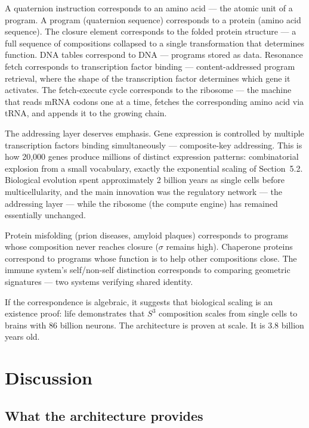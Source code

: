 \documentclass[12pt,a4paper]{article}
\begin{document}
A quaternion instruction corresponds to an amino acid --- the atomic unit of a program. A program (quaternion sequence) corresponds to a protein (amino acid sequence). The closure element corresponds to the folded protein structure --- a full sequence of compositions collapsed to a single transformation that determines function. DNA tables correspond to DNA --- programs stored as data. Resonance fetch corresponds to transcription factor binding --- content-addressed program retrieval, where the shape of the transcription factor determines which gene it activates. The fetch-execute cycle corresponds to the ribosome --- the machine that reads mRNA codons one at a time, fetches the corresponding amino acid via tRNA, and appends it to the growing chain.

The addressing layer deserves emphasis. Gene expression is controlled by multiple transcription factors binding simultaneously --- composite-key addressing. This is how 20,000 genes produce millions of distinct expression patterns: combinatorial explosion from a small vocabulary, exactly the exponential scaling of Section~5.2. Biological evolution spent approximately 2 billion years as single cells before multicellularity, and the main innovation was the regulatory network --- the addressing layer --- while the ribosome (the compute engine) has remained essentially unchanged.

Protein misfolding (prion diseases, amyloid plaques) corresponds to programs whose composition never reaches closure ($\sigma$ remains high). Chaperone proteins correspond to programs whose function is to help other compositions close. The immune system's self/non-self distinction corresponds to comparing geometric signatures --- two systems verifying shared identity.

If the correspondence is algebraic, it suggests that biological scaling is an existence proof: life demonstrates that $S^3$ composition scales from single cells to brains with 86 billion neurons. The architecture is proven at scale. It is 3.8 billion years old.


\section{Discussion}

\subsection{What the architecture provides}
\end{document}
